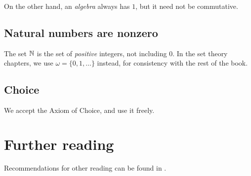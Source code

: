 On the other hand, an \emph{algebra} always has $1$,
but it need not be commutative.

\subsection*{Natural numbers are nonzero}
The set $\mathbb N$ is the set of \emph{positive} integers, not including $0$.
In the set theory chapters, we use $\omega = \{0, 1, \dots\}$
instead, for consistency with the rest of the book.

\subsection*{Choice}
We accept the Axiom of Choice, and use it freely.

\section{Further reading}
Recommendations for other reading can be found in .
